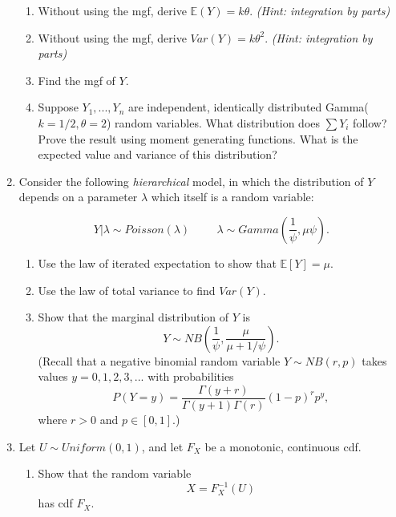 \documentclass[11pt]{article}
\begin{document}
\begin{enumerate}
\begin{enumerate}

\item Without using the mgf, derive $\mathbb{E}(Y) = k \theta$. \textit{(Hint: integration by parts)}

\item Without using the mgf, derive $Var(Y) = k \theta^2$. \textit{(Hint: integration by parts)}

\item Find the mgf of $Y$.

\item Suppose $Y_1, ..., Y_n$ are independent, identically distributed Gamma($k=1/2, \theta=2$) random variables.  What distribution does $\sum Y_i$ follow?  Prove the result using moment generating functions.  What is the expected value and variance of this distribution?\\
\end{enumerate}

\item Consider the following \textit{hierarchical} model, in which the distribution of $Y$ depends on a parameter $\lambda$ which itself is a random variable:

$$Y | \lambda \sim Poisson(\lambda) \hspace{1cm} \lambda \sim Gamma\left(\dfrac{1}{\psi}, \mu \psi\right).$$

\begin{enumerate}
\item Use the law of iterated expectation to show that $\mathbb{E}[Y] = \mu$.

\item Use the law of total variance to find $Var(Y)$.

\item Show that the marginal distribution of $Y$ is 
$$Y \sim NB \left( \dfrac{1}{\psi}, \dfrac{\mu}{\mu + 1/\psi}\right).$$
(Recall that a negative binomial random variable $Y \sim NB(r, p)$ takes values $y = 0, 1, 2, 3, ...$ with probabilities
$$P(Y = y) = \dfrac{\Gamma(y + r)}{\Gamma(y + 1)\Gamma(r)} (1 - p)^r p^y,$$
where $r > 0$ and $p \in [0,1]$.)
\end{enumerate}

\item Let $U \sim Uniform(0, 1)$, and let $F_X$ be a monotonic, continuous cdf. 

\begin{enumerate}
\item Show that the random variable
$$X = F_X^{-1}(U)$$
has cdf $F_X$.


\end{enumerate}
\end{enumerate}
\end{document}

